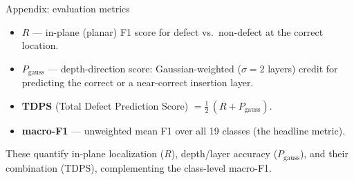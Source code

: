 \documentclass[aspectratio=169,12pt]{beamer}
\begin{document}
\begin{frame}{Appendix: evaluation metrics}
\begin{itemize}
  \item \textbf{$R$} --- in-plane (planar) F1 score for defect vs.\ non-defect at the
        correct location.
  \item \textbf{$P_{\mathrm{gauss}}$} --- depth-direction score: Gaussian-weighted
        ($\sigma = 2$ layers) credit for predicting the correct or a near-correct
        insertion layer.
  \item \textbf{TDPS} (Total Defect Prediction Score) $= \tfrac{1}{2}\,(R + P_{\mathrm{gauss}})$.
  \item \textbf{macro-F1} --- unweighted mean F1 over all 19 classes (the headline metric).
\end{itemize}
\vspace{0.4em}
These quantify in-plane localization ($R$), depth/layer accuracy ($P_{\mathrm{gauss}}$),
and their combination (TDPS), complementing the class-level macro-F1.
\end{frame}
\end{document}
